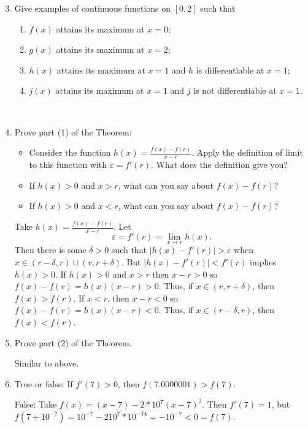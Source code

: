 \documentclass[12pt]{amsart}
\def\ds{\displaystyle}
\def\d{\delta}
\def\e{\varepsilon}
\numberwithin{equation}{section}
\theoremstyle{plain} %
\theoremstyle{definition}
\theoremstyle{remark}
\begin{document}
	\begin{enumerate}
	\setcounter{enumi}{2}
 
 \item Give examples of continuous functions on $[0,2]$ such that
 \begin{enumerate}
 \item $f(x)$ attains its maximum at $x=0$;
 \item $g(x)$ attains its maximum at $x=2$;
 \item $h(x)$ attains its maximum at $x=1$ and $h$ is differentiable at $x=1$;
 \item $j(x)$ attains its maximum at $x=1$ and $j$ is not differentiable at $x=1$.
 \end{enumerate}
 
 \
 
 \item Prove part (1) of the Theorem:
 \begin{itemize}
 \item Consider the function $\ds h(x) = \frac{ f(x) - f(r) }{x-r}$. Apply the definition of limit to this function with $\e = f'(r)$. What does the definition give you?
 \item If $h(x) > 0$ and $x>r$, what can you say about $f(x) - f(r)$?
  \item If $h(x) > 0$ and $x<r$, what can you say about $f(x) - f(r)$?
  \end{itemize}

\begin{framed}
Take $h(x) = \frac{ f(x) - f(r) }{x - r}$.  Let \[\e=f'(r) = \lim_{x\to r} h(x).\] Then there is some $\d>0$ such that $|h(x) - f'(r)| > \e$ when $x\in (r-\d,r) \cup (r,r+\d)$. But $|h(x) - f'(r)| < f'(r)$ implies $h(x)>0$. If $h(x)>0$ and $x>r$ then $x-r>0$ so $f(x)-f(r) = h(x) (x-r)>0$. Thus, if $x\in (r,r+\d)$, then $f(x)>f(r)$. If $x<r$, then $x-r<0$ so $f(x)-f(r) = h(x) (x-r)<0$. Thus, if $x\in (r-\d,r)$, then $f(x)<f(r)$.
\end{framed}

 \item Prove part (2) of the Theorem.
 
\begin{framed}
Similar to above.
\end{framed}
 
 \item True or false: If $f'(7)>0$, then $f(7.0000001)>f(7)$.
 
\begin{framed}
False: Take $f(x)=(x-7) - 2*10^7(x-7)^2$. Then $f'(7) = 1$, but $f(7+10^{-7}) =10^{-7} - 2 10^7* 10^{-14} = -10^{-7}<0 = f(7)$.
\end{framed}
 

\end{enumerate}
\end{document}
